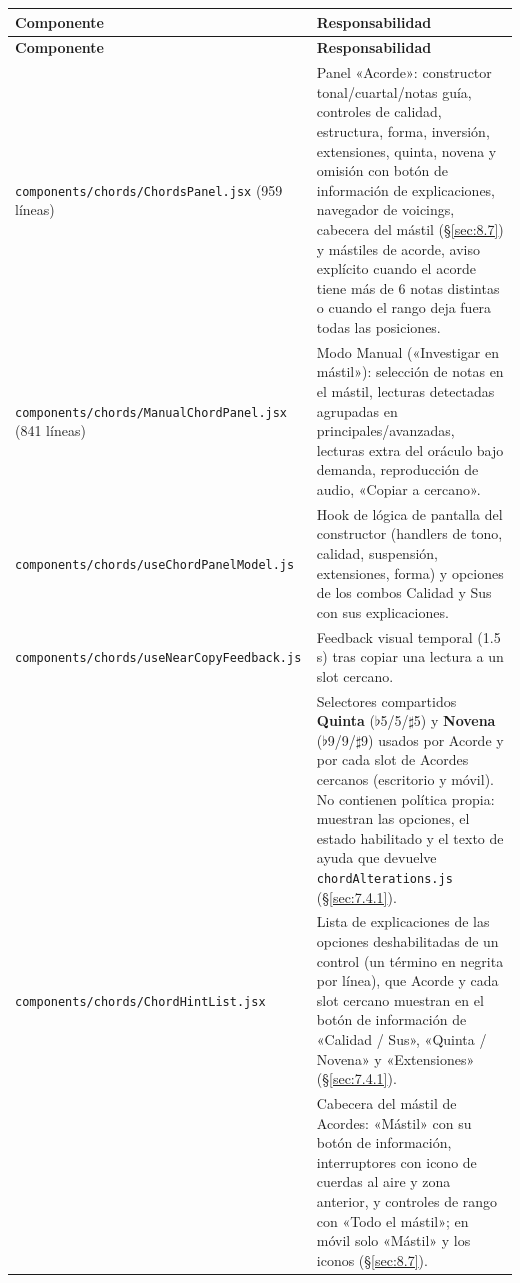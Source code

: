 \documentclass[a4paper,11pt,oneside]{report}
\newcommand{\Sref}[1]{\S\ref{#1}}
\newcommand{\flt}{\ensuremath{\flat}}
\newcommand{\shp}{\ensuremath{\sharp}}
\begin{document}
\begin{center}
\begin{longtable}{L{5.0cm}L{9.3cm}}
\toprule
{}\textbf{Componente} & \textbf{Responsabilidad}\\
\midrule
\endfirsthead
{}\textbf{Componente} & \textbf{Responsabilidad}\\
\midrule
\endhead
\bottomrule
\endlastfoot
\lstinline!components/chords/ChordsPanel.jsx! (959 líneas) & Panel «Acorde»: constructor tonal/cuartal/notas guía, controles de calidad, estructura, forma, inversión, extensiones, quinta, novena y omisión con botón de información de explicaciones, navegador de voicings, cabecera del mástil (\Sref{sec:8.7}) y mástiles de acorde, aviso explícito cuando el acorde tiene más de 6 notas distintas o cuando el rango deja fuera todas las posiciones.\\
\lstinline!components/chords/ManualChordPanel.jsx! (841 líneas) & Modo Manual («Investigar en mástil»): selección de notas en el mástil, lecturas detectadas agrupadas en principales/avanzadas, lecturas extra del oráculo bajo demanda, reproducción de audio, «Copiar a cercano».\\
\lstinline!components/chords/useChordPanelModel.js! & Hook de lógica de pantalla del constructor (handlers de tono, calidad, suspensión, extensiones, forma) y opciones de los combos Calidad y Sus con sus explicaciones.\\
\lstinline!components/chords/useNearCopyFeedback.js! & Feedback visual temporal (1.5\,s) tras copiar una lectura a un slot cercano.\\
\texttt{} & Selectores compartidos \textbf{Quinta} (\flt5/5/\shp5) y \textbf{Novena} (\flt9/9/\shp9) usados por Acorde y por cada slot de Acordes cercanos (escritorio y móvil). No contienen política propia: muestran las opciones, el estado habilitado y el texto de ayuda que devuelve \lstinline!chordAlterations.js! (\Sref{sec:7.4.1}).\\
\lstinline!components/chords/ChordHintList.jsx! & Lista de explicaciones de las opciones deshabilitadas de un control (un término en negrita por línea), que Acorde y cada slot cercano muestran en el botón de información de «Calidad / Sus», «Quinta / Novena» y «Extensiones» (\Sref{sec:7.4.1}).\\
\texttt{} & Cabecera del mástil de Acordes: «Mástil» con su botón de información, interruptores con icono de cuerdas al aire y zona anterior, y controles de rango con «Todo el mástil»; en móvil solo «Mástil» y los iconos (\Sref{sec:8.7}).\\
\end{longtable}
\end{center}
\end{document}
